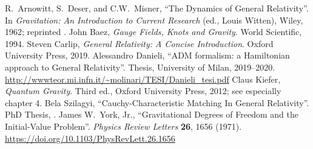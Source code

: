 
\begin{thebibliography}{99}
  R.~Arnowitt, S.~Deser, and C.W.~Misner,
  ``The Dynamics of General Relativity''.
  In \emph{Gravitation: An Introduction to Current Research}
  (ed., Louis Witten), Wiley, 1962; reprinted .
  John Baez,
  \emph{Gauge Fields, Knots and Gravity}.
  World Scientific, 1994.
  Steven Carlip,
  \emph{General Relativity: A Concise Introduction}.
  Oxford University Press, 2019.
  Alessandro Danieli,
  ``ADM formalism: a Hamiltonian approach to General Relativity''.
  Thesis, University of Milan, 2019--2020.\newline
  \url{http://wwwteor.mi.infn.it/~molinari/TESI/Danieli_tesi.pdf}
  Claus Kiefer,
  \emph{Quantum Gravity}.
  Third ed., Oxford University Press, 2012; see especially chapter 4.
  Bela Szilagyi,
  ``Cauchy-Characteristic Matching In General Relativity''.
  PhD Thesis, .
  James W.~York, Jr.,
  ``Gravitational Degrees of Freedom and the Initial-Value Problem''.
  \emph{Physics Review Letters} \textbf{26}, 1656 (1971).\newline
  \url{https://doi.org/10.1103/PhysRevLett.26.1656}
\end{thebibliography}